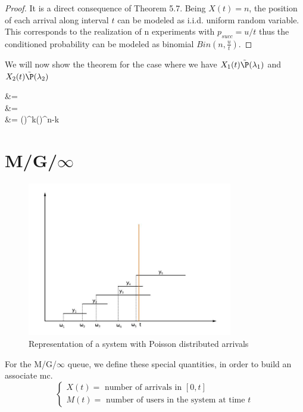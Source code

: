 \begin{proof}
	It is a direct consequence of Theorem 5.7.
	Being $X(t)=n$, the position of each arrival along interval $t$ can be modeled as i.i.d. uniform random variable. This corresponds to the realization of n experiments with $p_{succ}=u/t$ thus the conditioned probability can be modeled as binomial $Bin(n,\frac{u}{t})$.
\end{proof}

We will now show the theorem for the case where we have $X_1(t)\tilde\P(\lambda_1)$ and $X_2(t)\tilde\P(\lambda_2)$
\begin{esp}
	\prob[X_1(t)=k |X_1(t)+X_2(t)=n] &= \frac{\prob[X_1(t)=k |X_1(t)=k,X_2(t)=n-k]}{\prob[X_1(t)+X_2(t)=n]}\\
	&=  \\
	&=  \cdot \left(\right)^{k}\cdot \left(\right)^{n-k}
\end{esp}

\section{M/G/$\infty$}

\begin{figure}[h]
	\centering
	\includegraphics[width=0.8\textwidth]{img/mginf}
	\caption{Representation of a system with Poisson distributed arrivals}
\end{figure}

For the M/G/$\infty$ queue, we define these special quantities, in order to build an associate \gls{mc}.
\begin{equation*}
	\begin{cases}
		X(t) = \text{ number of arrivals in }[ 0, t ] \\
		M(t) = \text{ number of users in the system at time }t
	\end{cases}
\end{equation*}

